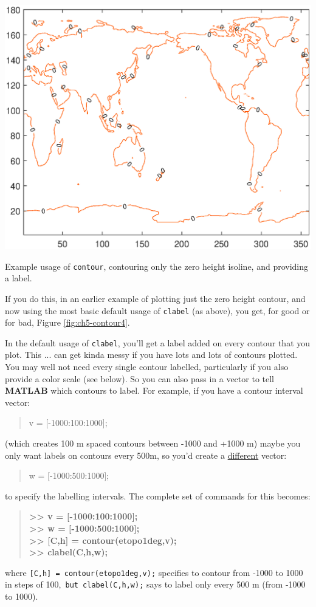 \documentclass{tufte-book} %
\newenvironment{docspec}{\begin{quotation}\ttfamily\parskip0pt\parindent0pt\ignorespaces}{\end{quotation}}
\newenvironment{docspecbold}{\begin{quotation}\ttfamily\bfseries\parskip0pt\parindent0pt\ignorespaces}{\end{quotation}}
\begin{document}
\begin{marginfigure}[-0.0in]
\includegraphics[width=\linewidth]{ch5-contour4.eps}
\caption{Example usage of \texttt{contour}, contouring only the zero height isoline, and providing a label.}
\label{fig:ch5-contour4}
\end{marginfigure}

If you do this, in an earlier example of plotting just the zero height contour, and now using the most basic default usage of \texttt{clabel} (as above), you get, for good or for bad, Figure \ref{fig:ch5-contour4}.

In the default usage of \texttt{clabel}, you'll get a label added on every contour that you plot. This ... can get kinda messy if you have lots and lots of contours plotted. You may well not need every single contour labelled, particularly if you also provide a color scale (see below). So you can also pass in a vector to tell \textbf{MATLAB} which contours to label. For example, if you have a contour interval vector:
\begin{docspec}
v = [-1000:100:1000];
\end{docspec}
(which creates 100 m spaced contours between -1000 and +1000 m) maybe you only want labels on contours every 500m, so you'd create a \uline{different} vector:
\begin{docspec}
w = [-1000:500:1000];
\end{docspec}
to specify the labelling intervals. The complete set of commands for this becomes:
\begin{docspecbold}
>> v = [-1000:100:1000];
\\ >> w = [-1000:500:1000];
\\ >> [C,h] = contour(etopo1deg,v);
\\ >> clabel(C,h,w);
\end{docspecbold}
where \texttt{[C,h] = contour(etopo1deg,v);} specifies to contour from -1000 to 1000 in steps of 100,\texttt{ but clabel(C,h,w);} says to label only every 500 m (from -1000 to 1000).
\end{document}
